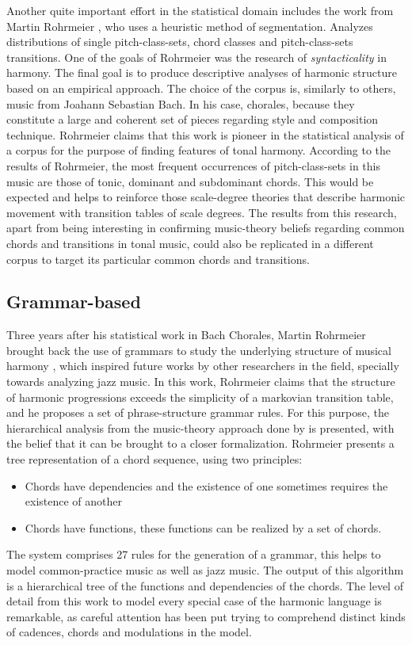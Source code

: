 Another quite important effort in the statistical domain
includes the work from Martin Rohrmeier
\cite{rohrmeier2008statistical}, who uses a heuristic method
of segmentation. Analyzes distributions of single
pitch-class-sets, chord classes and pitch-class-sets
transitions. One of the goals of Rohrmeier was the research
of \emph{syntacticality} in harmony. The final goal is to
produce descriptive analyses of harmonic structure based on
an empirical approach. The choice of the corpus is,
similarly to others, music from Joahann Sebastian Bach. In
his case, chorales, because they constitute a large and
coherent set of pieces regarding style and composition
technique. Rohrmeier claims that this work is pioneer in the
statistical analysis of a corpus for the purpose of finding
features of tonal harmony. According to the results of
Rohrmeier, the most frequent occurrences of pitch-class-sets
in this music are those of tonic, dominant and subdominant
chords. This would be expected and helps to reinforce those
scale-degree theories that describe harmonic movement with
transition tables of scale degrees. The results from this
research, apart from being interesting in confirming
music-theory beliefs regarding common chords and transitions
in tonal music, could also be replicated in a different
corpus to target its particular common chords and
transitions.

\subsection{Grammar-based} Three years after his statistical
work in Bach Chorales, Martin Rohrmeier brought back the use
of grammars to study the underlying structure of musical
harmony \cite{rohrmeier2011towards}, which inspired future
works by other researchers in the field, specially towards
analyzing jazz music. In this work, Rohrmeier claims that
the structure of harmonic progressions exceeds the
simplicity of a markovian transition table, and he proposes
a set of phrase-structure grammar rules. For this purpose,
the hierarchical analysis from the music-theory approach
done by \cite{kostka1995tonal} is presented, with the belief
that it can be brought to a closer formalization. Rohrmeier
presents a tree representation of a chord sequence, using
two principles: \begin{itemize} \item Chords have
dependencies and the existence of one sometimes requires the
existence of another \item Chords have functions, these
functions can be realized by a set of chords. \end{itemize}
The system comprises 27 rules for the generation of a
grammar, this helps to model common-practice music as well
as jazz music. The output of this algorithm is a
hierarchical tree of the functions and dependencies of the
chords. The level of detail from this work to model every
special case of the harmonic language is remarkable, as
careful attention has been put trying to comprehend distinct
kinds of cadences, chords and modulations in the model.

